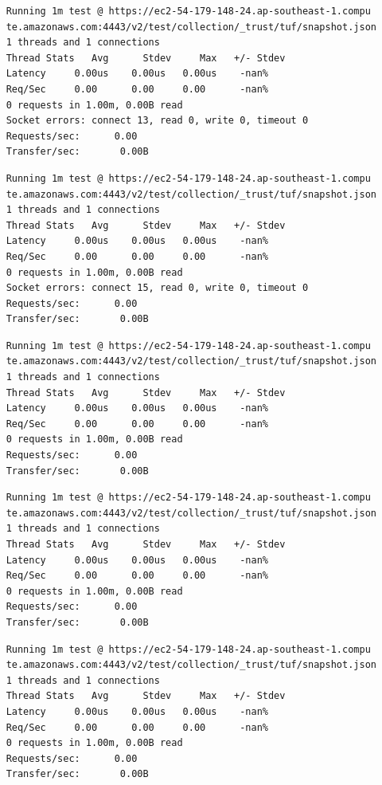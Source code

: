 \documentclass[a4paper,12pt]{article}
\newcounter{subsubsubsection}[subsubsection]
\begin{document}
{{	
	\begin{verbatim}
	Running 1m test @ https://ec2-54-179-148-24.ap-southeast-1.compu
	te.amazonaws.com:4443/v2/test/collection/_trust/tuf/snapshot.json
	1 threads and 1 connections
	Thread Stats   Avg      Stdev     Max   +/- Stdev
	Latency     0.00us    0.00us   0.00us    -nan%
	Req/Sec     0.00      0.00     0.00      -nan%
	0 requests in 1.00m, 0.00B read
	Socket errors: connect 13, read 0, write 0, timeout 0
	Requests/sec:      0.00
	Transfer/sec:       0.00B
	\end{verbatim}
	\begin{verbatim}
	Running 1m test @ https://ec2-54-179-148-24.ap-southeast-1.compu
	te.amazonaws.com:4443/v2/test/collection/_trust/tuf/snapshot.json
	1 threads and 1 connections
	Thread Stats   Avg      Stdev     Max   +/- Stdev
	Latency     0.00us    0.00us   0.00us    -nan%
	Req/Sec     0.00      0.00     0.00      -nan%
	0 requests in 1.00m, 0.00B read
	Socket errors: connect 15, read 0, write 0, timeout 0
	Requests/sec:      0.00
	Transfer/sec:       0.00B
	\end{verbatim}
	\begin{verbatim}
	Running 1m test @ https://ec2-54-179-148-24.ap-southeast-1.compu
	te.amazonaws.com:4443/v2/test/collection/_trust/tuf/snapshot.json
	1 threads and 1 connections
	Thread Stats   Avg      Stdev     Max   +/- Stdev
	Latency     0.00us    0.00us   0.00us    -nan%
	Req/Sec     0.00      0.00     0.00      -nan%
	0 requests in 1.00m, 0.00B read
	Requests/sec:      0.00
	Transfer/sec:       0.00B
	\end{verbatim}
	\begin{verbatim}
	Running 1m test @ https://ec2-54-179-148-24.ap-southeast-1.compu
	te.amazonaws.com:4443/v2/test/collection/_trust/tuf/snapshot.json
	1 threads and 1 connections
	Thread Stats   Avg      Stdev     Max   +/- Stdev
	Latency     0.00us    0.00us   0.00us    -nan%
	Req/Sec     0.00      0.00     0.00      -nan%
	0 requests in 1.00m, 0.00B read
	Requests/sec:      0.00
	Transfer/sec:       0.00B
	\end{verbatim}
	\newpage
	\begin{verbatim}
	Running 1m test @ https://ec2-54-179-148-24.ap-southeast-1.compu
	te.amazonaws.com:4443/v2/test/collection/_trust/tuf/snapshot.json
	1 threads and 1 connections
	Thread Stats   Avg      Stdev     Max   +/- Stdev
	Latency     0.00us    0.00us   0.00us    -nan%
	Req/Sec     0.00      0.00     0.00      -nan%
	0 requests in 1.00m, 0.00B read
	Requests/sec:      0.00
	Transfer/sec:       0.00B
	

\end{verbatim}}}
\end{document}

